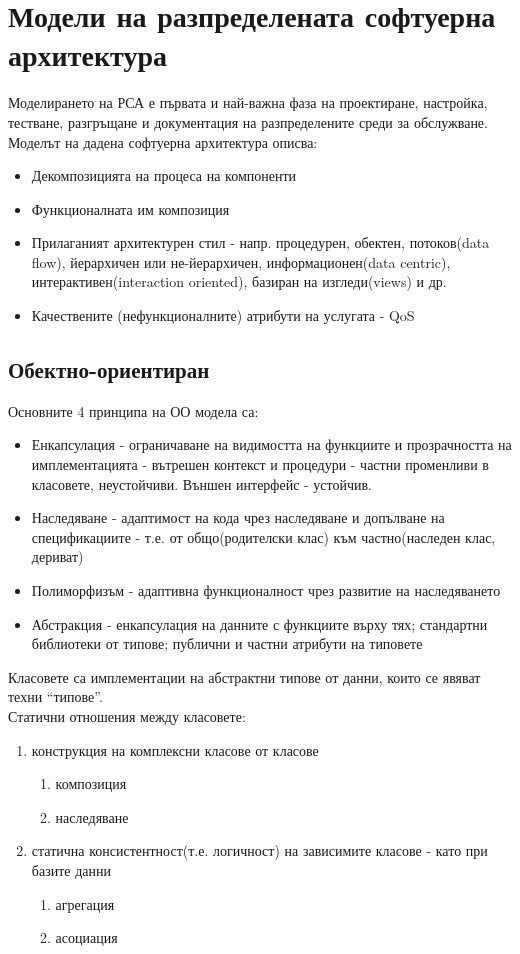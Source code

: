 \documentclass[11pt]{article} %
\begin{document}
\section{Модели на разпределената софтуерна архитектура}
Моделирането на РСА е първата и най-важна фаза на проектиране, настройка, тестване, разгръщане и документация на разпределените среди за обслужване. Моделът на дадена софтуерна архитектура описва:
\begin{itemize}[noitemsep]
	\item Декомпозицията на процеса на компоненти
	\item Функционалната им композиция
	\item Прилаганият архитектурен стил - напр. процедурен, обектен, потоков(data flow), йерархичен или не-йерархичен, информационен(data centric), интерактивен(interaction oriented), базиран на изгледи(views) и др.
	\item Качествените (нефункционалните) атрибути на услугата - QoS
\end{itemize}

\subsection{Обектно-ориентиран}
Основните 4 принципа на ОО модела са:
\begin{itemize}[noitemsep]
	\item Енкапсулация - ограничаване на видимостта на функциите и прозрачността на имплементацията - вътрешен контекст и процедури - частни променливи в класовете, неустойчиви. Външен интерфейс - устойчив.
	\item Наследяване - адаптимост на кода чрез наследяване и допълване на спецификациите - т.е. от общо(родителски клас) към частно(наследен клас, дериват)
	\item Полиморфизъм - адаптивна функционалност чрез развитие на наследяването
	\item Абстракция - енкапсулация на данните с функциите върху тях; стандартни библиотеки от типове; публични и частни атрибути на типовете
\end{itemize}

Класовете са имплементации на абстрактни типове от данни, които се явяват техни \enquote{типове}. \\

Статични отношения между класовете:
\begin{enumerate}[noitemsep]
	\item конструкция на комплексни класове от класове
	\begin{enumerate}[noitemsep]
		\item композиция
		\item наследяване
	\end{enumerate}
	\item статична консистентност(т.е. логичност) на зависимите класове - като при базите данни
	\begin{enumerate}[noitemsep]
		\item агрегация
		\item асоциация\\
	\end{enumerate}
\end{enumerate}
\end{document}
